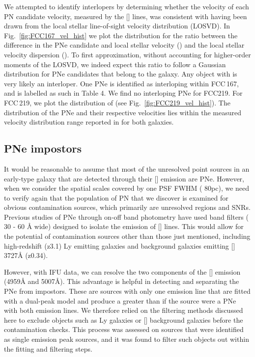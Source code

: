 \documentclass{aa}
\begin{document}
We attempted to identify interlopers by determining whether the velocity of each PN candidate velocity, measured by the [] lines, was consistent with having been drawn from the local stellar line-of-sight velocity distribution (LOSVD). In Fig.~\ref{fig:FCC167_vel_hist} we plot the distribution for the ratio between the difference in the PNe candidate and local stellar velocity () and the local stellar velocity dispersion (). To first approximation, without accounting for higher-order moments of the LOSVD, we indeed expect this  ratio to follow a Gaussian distribution for PNe candidates that belong to the galaxy. Any object with  is very likely an interloper. One PNe is identified as interloping within FCC\,167, and is labelled as such in Table 4. We find no interloping PNe for FCC219. For FCC\,219, we plot the distribution of (see Fig.~\ref{fig:FCC219_vel_hist}). The distribution of the PNe and their respective velocities lies within the measured velocity distribution range reported in \citet{iodice_fornax3d_2019} for both galaxies.


\subsection{PNe impostors}

It would be reasonable to assume that most of the unresolved point sources in an early-type galaxy that are detected through their [] emission are PNe. However, when we consider the spatial scales covered by one PSF FWHM ( 80pc), we need to verify again that the population of PN that we discover is examined for obvious contamination sources, which primarily are unresolved  regions and SNRs. Previous studies of PNe through on-off band photometry have used band filters ( 30 - 60 \AA{} wide) designed to isolate the emission of [] lines. This would allow for the potential of contamination sources other than those just mentioned, including high-redshift (z3.1) Ly emitting galaxies and background galaxies emitting []\,3727\AA{} (z0.34).


However, with IFU data, we can resolve the two components of the [] emission (4959\AA{} and 5007\AA{}). This advantage is helpful in detecting and separating the PNe from impostors. These are sources with only one emission line that are fitted with a dual-peak model and produce a  greater than if the source were a PNe with both emission lines. We therefore relied on the filtering methods discussed here to exclude objects such as Ly galaxies or [] background galaxies before the contamination checks. This process was assessed on sources that were identified as single emission peak sources, and it was found to filter such objects out within the fitting and filtering steps.
\end{document}
